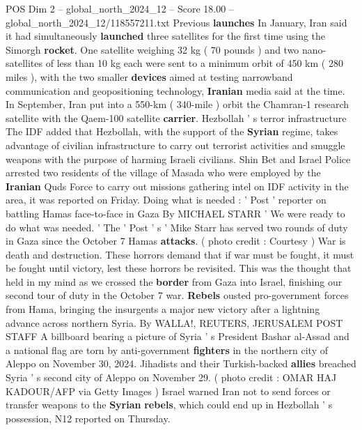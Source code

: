 \begin{textsample}{POS Dim 2 – global\_north\_2024\_12 – Score 18.00 – global\_north\_2024\_12/118557211.txt}
Previous \textbf{launches} In January, Iran said it had simultaneously \textbf{launched} three satellites for the first time using the Simorgh \textbf{rocket}.
One satellite weighing 32 kg ( 70 pounds ) and two nano-satellites of less than 10 kg each were sent to a minimum orbit of 450 km ( 280 miles ), with the two smaller \textbf{devices} aimed at testing narrowband communication and geopositioning technology, \textbf{Iranian} media said at the time.
In September, Iran put into a 550-km ( 340-mile ) orbit the Chamran-1 research satellite with the Qaem-100 satellite \textbf{carrier}.
Hezbollah ' s terror infrastructure The IDF added that Hezbollah, with the support of the \textbf{Syrian} regime, takes advantage of civilian infrastructure to carry out terrorist activities and smuggle weapons with the purpose of harming Israeli civilians.
Shin Bet and Israel Police arrested two residents of the village of Masada who were employed by the \textbf{Iranian} Quds Force to carry out missions gathering intel on IDF activity in the area, it was reported on Friday.
Doing what is needed : ' Post ' reporter on battling Hamas face-to-face in Gaza By MICHAEL STARR ' We were ready to do what was needed. ' The ' Post ' s ' Mike Starr has served two rounds of duty in Gaza since the October 7 Hamas \textbf{attacks}. ( photo credit : Courtesy ) War is death and destruction.
These horrors demand that if war must be fought, it must be fought until victory, lest these horrors be revisited.
This was the thought that held in my mind as we crossed the \textbf{border} from Gaza into Israel, finishing our second tour of duty in the October 7 war. \textbf{Rebels} ousted pro-government forces from Hama, bringing the insurgents a major new victory after a lightning advance across northern Syria.
By WALLA!, REUTERS, JERUSALEM POST STAFF A billboard bearing a picture of Syria ' s President Bashar al-Assad and a national flag are torn by anti-government \textbf{fighters} in the northern city of Aleppo on November 30, 2024.
Jihadists and their Turkish-backed \textbf{allies} breached Syria ' s second city of Aleppo on November 29. ( photo credit : OMAR HAJ KADOUR/AFP via Getty Images ) Israel warned Iran not to send forces or transfer weapons to the \textbf{Syrian} \textbf{rebels}, which could end up in Hezbollah ' s possession, N12 reported on Thursday.

\end{textsample}
